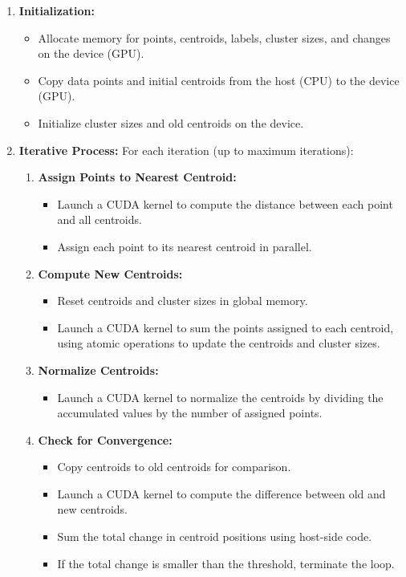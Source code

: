 \documentclass[letterpaper,12pt]{article}
\theoremstyle{remark}
\begin{document}
\begin{enumerate}
    \item \textbf{Initialization:}
    \begin{itemize}
        \item Allocate memory for points, centroids, labels, cluster sizes, and changes on the device (GPU).
        \item Copy data points and initial centroids from the host (CPU) to the device (GPU).
        \item Initialize cluster sizes and old centroids on the device.
    \end{itemize}

    \item \textbf{Iterative Process:} For each iteration (up to maximum iterations):
    \begin{enumerate}
        \item \textbf{Assign Points to Nearest Centroid:}
        \begin{itemize}
            \item Launch a CUDA kernel to compute the distance between each point and all centroids.
            \item Assign each point to its nearest centroid in parallel.
        \end{itemize}
        
        \item \textbf{Compute New Centroids:}
        \begin{itemize}
            \item Reset centroids and cluster sizes in global memory.
            \item Launch a CUDA kernel to sum the points assigned to each centroid, using atomic operations to update the centroids and cluster sizes.
        \end{itemize}
        
        \item \textbf{Normalize Centroids:}
        \begin{itemize}
            \item Launch a CUDA kernel to normalize the centroids by dividing the accumulated values by the number of assigned points.
        \end{itemize}
        
        \item \textbf{Check for Convergence:}
        \begin{itemize}
            \item Copy centroids to old centroids for comparison.
            \item Launch a CUDA kernel to compute the difference between old and new centroids.
            \item Sum the total change in centroid positions using host-side code.
            \item If the total change is smaller than the threshold, terminate the loop.
        \end{itemize}
    \end{enumerate}
    

\end{enumerate}
\end{document}

